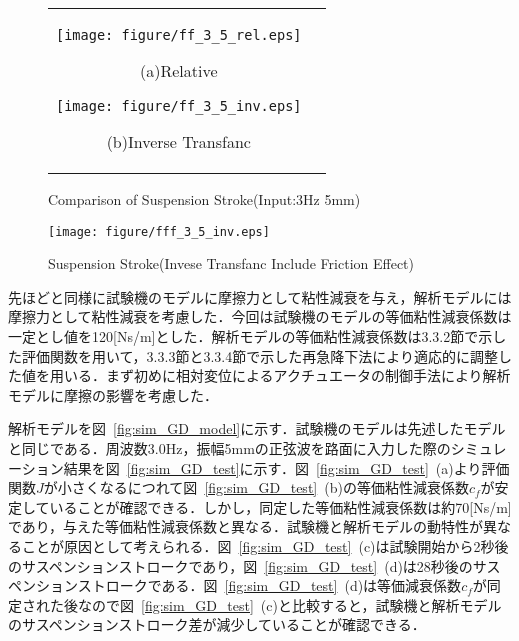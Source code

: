 \documentclass[a4paper,12pt]{article_vdlab_sotsuron}
\begin{document}
\begin{figure}[h]
  \begin{tabular}{cc}
  \begin{minipage}{0.5\hsize}
  \begin{center}
    \texttt{[image: figure/ff\_3\_5\_rel.eps]}
    \end{center}
    \begin{center}
    \ (a)Relative\
    \end{center}
  \end{minipage}
  \begin{minipage}{0.5\hsize}
     \begin{center}
      \texttt{[image: figure/ff\_3\_5\_inv.eps]}
      \end{center}
      \begin{center}
      \ (b)Inverse Transfanc\
    \end{center}
  \end{minipage}
  \end{tabular}
  \vspace*{3mm}
  \caption{Comparison of Suspension Stroke(Input:3Hz 5mm)}
    \label{fig:fri_5_3_f}
\end{figure}
\begin{figure}[h!]
  \begin{center}
    \texttt{[image: figure/fff\_3\_5\_inv.eps]}
    \vspace*{3mm}
    \caption{Suspension Stroke(Invese Transfanc Include Friction Effect)}
    \label{fig:fri_5_3_f_inv}
  \end{center}
\end{figure}
\newpage
先ほどと同様に試験機のモデルに摩擦力として粘性減衰を与え，解析モデルには摩擦力として粘性減衰を考慮した．今回は試験機のモデルの等価粘性減衰係数は一定とし値を120[Ns/m]とした．解析モデルの等価粘性減衰係数は3.3.2節で示した評価関数を用いて，3.3.3節と3.3.4節で示した再急降下法により適応的に調整した値を用いる．まず初めに相対変位によるアクチュエータの制御手法により解析モデルに摩擦の影響を考慮した．
\par
解析モデルを図~\ref{fig:sim_GD_model}に示す．試験機のモデルは先述したモデルと同じである．周波数3.0Hz，振幅5mmの正弦波を路面に入力した際のシミュレーション結果を図~\ref{fig:sim_GD_test}に示す．図~\ref{fig:sim_GD_test}~(a)より評価関数$J$が小さくなるにつれて図~\ref{fig:sim_GD_test}~(b)の等価粘性減衰係数$c_f$が安定していることが確認できる．しかし，同定した等価粘性減衰係数は約70[Ns/m]であり，与えた等価粘性減衰係数と異なる．試験機と解析モデルの動特性が異なることが原因として考えられる．図~\ref{fig:sim_GD_test}~(c)は試験開始から2秒後のサスペンションストロークであり，図~\ref{fig:sim_GD_test}~(d)は28秒後のサスペンションストロークである．図~\ref{fig:sim_GD_test}~(d)は等価減衰係数$c_f$が同定された後なので図~\ref{fig:sim_GD_test}~(c)と比較すると，試験機と解析モデルのサスペンションストローク差が減少していることが確認できる．
\end{document}
